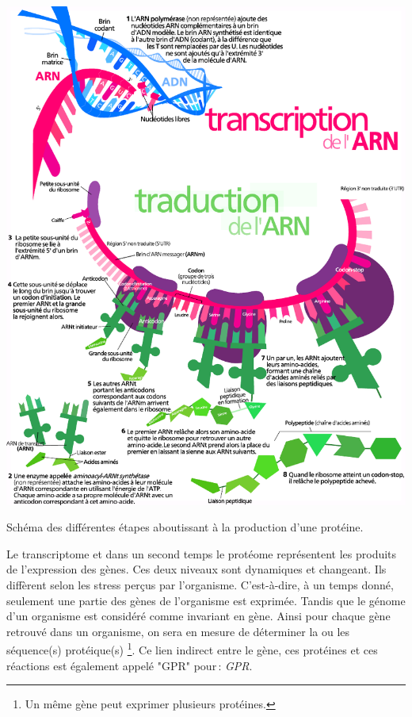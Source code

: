 \begin{refsegment}
    \begin{shadedfigure}[H]
        \centering
        \includegraphics[width=\textwidth]{img/production_proteine2.pdf}
        \caption{Schéma des différentes étapes aboutissant à la production d’une protéine.}
        \label{fig:production_proteine}
    \end{shadedfigure}
    
    Le transcriptome et dans un second temps le protéome représentent les produits de l'expression des gènes. Ces deux niveaux sont dynamiques et changeant. Ils diffèrent selon les stress perçus par l'organisme. C'est-à-dire, à un temps donné, seulement une partie des gènes de l'organisme est exprimée. Tandis que le génome d'un organisme est considéré comme invariant en gène. Ainsi pour chaque gène retrouvé dans un organisme, on sera en mesure de déterminer la ou les séquence(s) protéique(s) \footnote{Un même gène peut exprimer plusieurs protéines.}. Ce lien indirect entre le gène, ces protéines et ces réactions est également appelé "\acrshort{GPR}" pour : \textit{\acrfull{GPR}}.
    

\end{refsegment}
